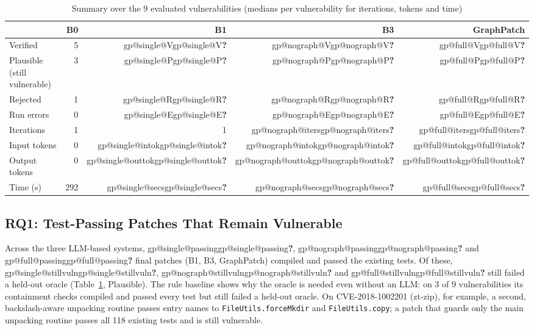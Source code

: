 \documentclass[conference]{IEEEtran}
\makeatletter
\newcommand{\code}[1]{\texttt{#1}}
\newcommand{\res}[1]{\ifcsname gp@#1\endcsname\csname gp@#1\endcsname\else\textbf{?}\fi}
\makeatother
\begin{document}
\begin{table}[t]
\centering
\caption{Summary over the 9 evaluated vulnerabilities (medians per vulnerability for
iterations, tokens and time)}
\label{tab:summary}
\begin{tabular}{lrrrr}
\toprule
 & B0 & B1 & B3 & GraphPatch \\
\midrule
Verified                     & 5 & \res{single@V} & \res{nograph@V} & \res{full@V} \\
Plausible (still vulnerable) & 3 & \res{single@P} & \res{nograph@P} & \res{full@P} \\
Rejected                     & 1 & \res{single@R} & \res{nograph@R} & \res{full@R} \\
Run errors                   & 0 & \res{single@E} & \res{nograph@E} & \res{full@E} \\
Iterations                   & 1 & 1 & \res{nograph@iters} & \res{full@iters} \\
Input tokens                 & 0 & \res{single@intok} & \res{nograph@intok} & \res{full@intok} \\
Output tokens                & 0 & \res{single@outtok} & \res{nograph@outtok} & \res{full@outtok} \\
Time (s)                     & 292 & \res{single@secs} & \res{nograph@secs} & \res{full@secs} \\
\bottomrule
\end{tabular}
\end{table}

\subsection{RQ1: Test-Passing Patches That Remain Vulnerable}
Across the three LLM-based systems, \res{single@passing}, \res{nograph@passing} and
\res{full@passing} final patches (B1, B3, GraphPatch) compiled and passed the existing
tests. Of these, \res{single@stillvuln}, \res{nograph@stillvuln} and
\res{full@stillvuln} still failed a held-out oracle (Table~\ref{tab:summary}, Plausible).
The rule baseline shows why the oracle is needed even without an LLM: on 3 of 9
vulnerabilities its containment checks compiled and passed every test but still
failed a held-out oracle. On CVE-2018-1002201 (zt-zip), for example, a second,
backslash-aware unpacking routine passes entry names to \code{FileUtils.forceMkdir} and
\code{FileUtils.copy}; a patch that guards only the main unpacking routine passes all
118 existing tests and is still vulnerable.
\end{document}
